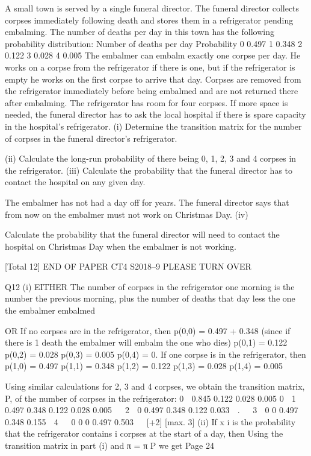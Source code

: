 \documentclass[a4paper,12pt]{article}
\begin{document}
A small town is served by a single funeral director. The funeral director collects
corpses immediately following death and stores them in a refrigerator pending
embalming. The number of deaths per day in this town has the following probability
distribution:
Number of
deaths per day Probability
0 0.497
1 0.348
2 0.122
3 0.028
4 0.005
The embalmer can embalm exactly one corpse per day. He works on a corpse from
the refrigerator if there is one, but if the refrigerator is empty he works on the first
corpse to arrive that day. Corpses are removed from the refrigerator immediately
before being embalmed and are not returned there after embalming.
The refrigerator has room for four corpses. If more space is needed, the funeral
director has to ask the local hospital if there is spare capacity in the hospital’s
refrigerator.
(i)
Determine the transition matrix for the number of corpses in the funeral
director’s refrigerator.

(ii) Calculate the long-run probability of there being 0, 1, 2, 3 and 4 corpses in the
refrigerator.
(iii) Calculate the probability that the funeral director has to contact the hospital on
any given day.

The embalmer has not had a day off for years. The funeral director says that from now
on the embalmer must not work on Christmas Day.
(iv)

Calculate the probability that the funeral director will need to contact the
hospital on Christmas Day when the embalmer is not working. 

[Total 12]
END OF PAPER
CT4 S2018–9 
PLEASE TURN OVER


Q12
(i)
EITHER
The number of corpses in the refrigerator one morning is the number
the previous morning, plus the number of deaths that day less the one
the embalmer embalmed

OR
If no corpses are in the refrigerator, then
p(0,0) = 0.497 + 0.348 (since if there is
1 death the embalmer will embalm the one who dies)
p(0,1) = 0.122
p(0,2) = 0.028
p(0,3) = 0.005
p(0,4) = 0.
If one corpse is in the refrigerator, then
p(1,0) = 0.497
p(1,1) = 0.348
p(1,2) = 0.122
p(1,3) = 0.028
p(1,4) = 0.005

Using similar calculations for 2, 3 and 4 corpses, we obtain the
transition matrix, P, of the number of corpses in the refrigerator:
0  0.845 0.122 0.028 0.005
0 
1   0.497 0.348 0.122 0.028 0.005  
2  0
0.497 0.348 0.122 0.033  .


3  0
0
0.497 0.348 0.155 
4   0
0
0
0.497 0.503  
[+2]
[max. 3]
(ii)
If x i is the probability that the refrigerator contains i corpses at the
start of a day, then
Using the transition matrix in part (i) and π = π P we get
Page 24
\end{document}
